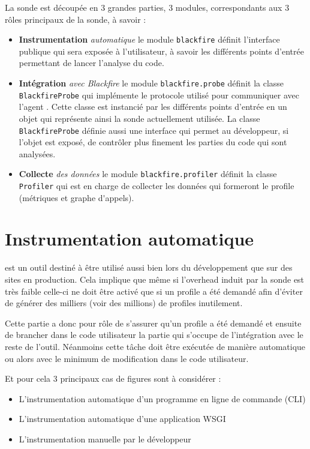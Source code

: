 La sonde est découpée en 3 grandes parties, 3 modules, correspondants aux 3 rôles principaux de la sonde, à savoir :
\begin{itemize}
\item \textbf{Instrumentation}\emph{ automatique} le module \texttt{blackfire} définit l'interface publique qui sera exposée à l'utilisateur, à savoir les différents points d'entrée permettant de lancer l'analyse du code.
\item \textbf{Intégration}\emph{ avec Blackfire} le module \texttt{blackfire.probe} définit la classe \\\texttt{BlackfireProbe} qui implémente le protocole utilisé pour communiquer avec l'agent \Blackfire. Cette classe est instancié par les différents points d'entrée en un objet qui représente ainsi la sonde actuellement utilisée. La classe \texttt{BlackfireProbe} définie aussi une interface qui permet au développeur, si l'objet est exposé, de contrôler plus finement les parties du code qui sont analysées.
\item \textbf{Collecte}\emph{ des données} le module \texttt{blackfire.profiler} définit la classe \texttt{Profiler} qui est en charge de collecter les données qui formeront le profile (métriques et \gls{graphe d'appels}).
\end{itemize}

  \chapter[Instrumentation]{Instrumentation automatique}
\Blackfire est un outil destiné à être utilisé aussi bien lors du développement que sur des sites en production. Cela implique que même si l'\gls{overhead} induit par la sonde est très faible celle-ci ne doit être activé que si un profile a été demandé afin d'éviter de générer des milliers (voir des millions) de profiles inutilement.

Cette partie a donc pour rôle de s'assurer qu'un profile a été demandé et ensuite de brancher dans le \gls{code utilisateur} la partie qui s'occupe de l'intégration avec le reste de l'outil. Néanmoins cette tâche doit être exécutée de manière automatique ou alors avec le minimum de modification dans le code utilisateur.

Et pour cela 3 principaux cas de figures sont à considérer :
\begin{itemize}
\item L'instrumentation automatique d'un programme en ligne de commande (\gls{CLI})
\item L'instrumentation automatique d'une application \gls{WSGI}
\item L'instrumentation manuelle par le développeur
\end{itemize}

